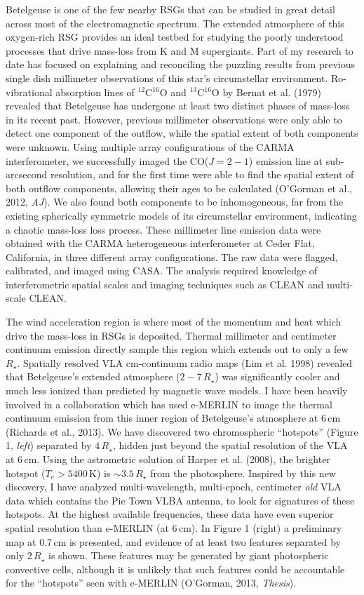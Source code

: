 \documentclass[11pt]{letter} %
\begin{document}
Betelgeuse is one of the few nearby RSGs that can be studied in great detail across most of the electromagnetic spectrum. The extended atmosphere of this oxygen-rich RSG provides an ideal testbed for studying the poorly understood processes that drive mass-loss from K and M supergiants. Part of my research to date has focused on explaining and reconciling the puzzling results from previous single dish millimeter observations of this star's circumstellar environment. Ro-vibrational absorption lines of $^{12}$C$^{16}$O and $^{13}$C$^{16}$O by Bernat et al. (1979) revealed that Betelgeuse has undergone at least two distinct phases of mass-loss in its recent past. However, previous millimeter observations were only able to detect one component of the outflow, while the spatial extent of both components were unknown. Using multiple array configurations of the CARMA interferometer, we successfully imaged the CO($J = 2 - 1$) emission line at sub-arcsecond resolution, and for the first time were able to find the spatial extent of both outflow components, allowing their ages to be calculated (O'Gorman et al., 2012, \textit{AJ}). We also found both components to be inhomogeneous, far from the existing spherically symmetric models of its circumstellar environment, indicating a chaotic mass-loss loss process. These millimeter line emission data were obtained with the CARMA heterogeneous interferometer at Ceder Flat, California, in three different array configurations. The raw data were flagged, calibrated, and imaged using CASA. The analysis required knowledge of interferometric spatial scales and imaging techniques such as CLEAN and multi-scale CLEAN. 

The wind acceleration region is where most of the momentum and heat which drive the mass-loss in RSGs is deposited. Thermal millimeter and centimeter continuum emission directly sample this region which extends out to only a few $R_{\star}$. Spatially resolved VLA cm-continuum radio maps (Lim et al. 1998) revealed that Betelgeuse's extended atmosphere ($2-7\,R_{\star}$) was significantly cooler and much less ionized than predicted by magnetic wave models. I have been heavily involved in a collaboration which has used e-MERLIN to image the thermal continuum emission from this inner region of Betelgeuse's atmosphere at 6\,cm (Richards et al., 2013). We have discovered two chromospheric ``hotspots'' (Figure 1, \textit{left}) separated by $4\,R_{\star}$, hidden just beyond the spatial resolution of the VLA at 6\,cm. Using the astrometric solution of Harper et al. (2008), the brighter hotspot ($T_{e} > 5400$\,K) is $\sim 3.5\,R_{\star}$ from the photosphere. Inspired by this new discovery, I have analyzed multi-wavelength, multi-epoch, centimeter \textit{old} VLA data which contains the Pie Town VLBA antenna, to look for signatures of these hotspots. At the highest available frequencies, these data have even superior spatial resolution than e-MERLIN (at 6\,cm).  In Figure 1 (right) a preliminary map at 0.7\,cm is presented, and evidence of at least two features separated by only $2\,R_{\star}$ is shown. These features may be generated by  giant photospheric convective cells, although it is unlikely that such features could be accountable for the ``hotspots'' seen with e-MERLIN (O'Gorman, 2013, \textit{Thesis}).
\end{document}
